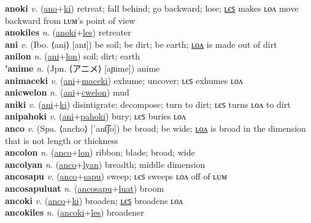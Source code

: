 \textbf{anoki} \textit{v.} (\hyperref[ano]{ano}+\hyperref[ki]{ki})
retreat; fall behind; go backward; lose; \hyperref[anokiles]{ʟєꜱ} makes ʟᴏᴧ move backward from ʟᴜᴍ’s point of view \label{anoki} \\
\textbf{anokiles} \textit{n.} (\hyperref[anoki]{anoki}+\hyperref[les]{les})
retreater \label{anokiles} \\
\textbf{ani} \textit{v.} (Ibo. ⟨anị⟩ [anɪ])
be soil; be dirt; be earth; \hyperref[anilon]{ʟᴏᴧ} is made out of dirt \label{ani} \\
\textbf{anilon} \textit{n.} (\hyperref[ani]{ani}+\hyperref[lon]{lon})
soil; dirt; earth \label{anilon} \\
\textbf{'anime} \textit{n.} (Jpn. ⟨アニメ⟩ [aɲime])
anime \label{'anime} \\
\textbf{animaceki} \textit{v.} (\hyperref[ani]{ani}+\hyperref[maceki]{maceki})
exhume; uncover; ʟєꜱ exhumes ʟᴏᴧ \label{animaceki} \\
\textbf{anicwelon} \textit{n.} (\hyperref[ani]{ani}+\hyperref[cwelon]{cwelon})
mud \label{anicwelon} \\
\textbf{aniki} \textit{v.} (\hyperref[ani]{ani}+\hyperref[ki]{ki})
disintigrate; decompose; turn to dirt; ʟєꜱ turns ʟᴏᴧ to dirt \label{aniki} \\
\textbf{anipahoki} \textit{v.} (\hyperref[ani]{ani}+\hyperref[pahoki]{pahoki})
bury; ʟєꜱ buries ʟᴏᴧ \label{anipahoki} \\
\textbf{anco} \textit{v.} (Spa. ⟨ancho⟩ [ˈant͡ʃo])
be broad; be wide; \hyperref[ancolon]{ʟᴏᴧ} is broad in the dimension that is not length or thickness \label{anco} \\
\textbf{ancolon} \textit{n.} (\hyperref[anco]{anco}+\hyperref[lon]{lon})
ribbon; blade; broad; wide \label{ancolon} \\
\textbf{ancolyan} \textit{n.} (\hyperref[anco]{anco}+\hyperref[lyan]{lyan})
breadth; middle dimension \label{ancolyan} \\
\textbf{ancosapu} \textit{v.} (\hyperref[anco]{anco}+\hyperref[sapu]{sapu})
sweep; ʟєꜱ sweeps ʟᴏᴧ off of ʟᴜᴍ \label{ancosapu} \\
\textbf{ancosapuluat} \textit{n.} (\hyperref[ancosapu]{ancosapu}+\hyperref[luat]{luat})
broom \label{ancosapuluat} \\
\textbf{ancoki} \textit{v.} (\hyperref[anco]{anco}+\hyperref[ki]{ki})
broaden; \hyperref[ancokiles]{ʟєꜱ} broadens ʟᴏᴧ \label{ancoki} \\
\textbf{ancokiles} \textit{n.} (\hyperref[ancoki]{ancoki}+\hyperref[les]{les})
broadener \label{ancokiles} \\
